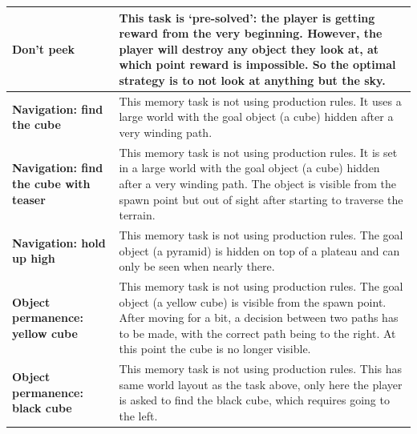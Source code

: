 \documentclass[11pt, a4paper, logo, copyright]{deepmind}
\begin{document}
\begin{appendix}
\begin{longtable}{|>{\raggedright}p{4cm}|p{12cm}|}
\textbf{Don't peek} & This task is `pre-solved': the player is getting reward from the very beginning. However, the player will destroy any object they look at, at which point reward is impossible. So the optimal strategy is to not look at anything but the sky. \\ \hline
\textbf{Navigation: find the cube} & This memory task is not using production rules. It uses a large world with the goal object (a cube) hidden after a very winding path. \\ \hline
\textbf{Navigation: find the cube with teaser} & This memory task is not using production rules. It is set in a large world with the goal object (a cube) hidden after a very winding path. The object is visible from the spawn point but out of sight after starting to traverse the terrain. \\ \hline
\textbf{Navigation: hold up high} & This memory task is not using production rules. The goal object (a pyramid) is hidden on top of a plateau and can only be seen when nearly there. \\ \hline
\textbf{Object permanence: yellow cube} & This memory task is not using production rules. The goal object (a yellow cube) is visible from the spawn point. After moving for a bit, a decision between two paths has to be made, with the correct path being to the right. At this point the cube is no longer visible. \\ \hline
\textbf{Object permanence: black cube} & This memory task is not using production rules. This has same world layout as the task above, only here the player is asked to find the black cube, which requires going to the left. \\
\hline
\end{longtable}


\end{appendix}
\end{document}
